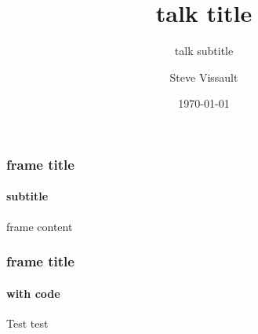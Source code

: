 \documentclass[10pt,aspectratio=149]{beamer}
\author{Steve Vissault}
\title{talk title}
\subtitle{talk subtitle}
\date{\today}
\institute{talk location}
\begin{document}
\begin{frame}[plain]
   \titlepage
\end{frame}

\begin{frame}
   \frametitle{frame title}
   \framesubtitle{subtitle}

   frame content
   
\end{frame}

\begin{frame}[fragile]
   \frametitle{frame title}
   \framesubtitle{with code}

   Test test

\end{frame}
\end{document}
